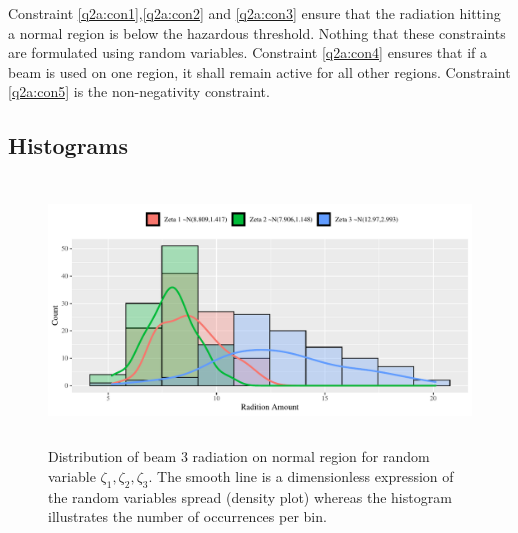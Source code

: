 \documentclass[a4paper,11pt]{article}
\begin{document}
Constraint \ref{q2a:con1},\ref{q2a:con2} and \ref{q2a:con3} ensure that the radiation hitting a normal region is below the hazardous threshold. Nothing that these constraints are formulated using random variables. Constraint \ref{q2a:con4} ensures that if a beam is used on one region, it shall remain active for all other regions. Constraint \ref{q2a:con5} is the non-negativity constraint.
\newpage

\subsection{Histograms}

\begin{figure}[hbt]	
  \includegraphics[width=14cm, height=7cm]{gg.zetall.pdf}
  \caption{Distribution of beam 3 radiation on normal region for random variable $\zeta_1,\zeta_2,\zeta_3$. The smooth line is a dimensionless expression of the random variables spread (density plot) whereas the histogram illustrates the number of occurrences per bin.}
  \label{fig:q2a.zeta}
\end{figure}
\end{document}
